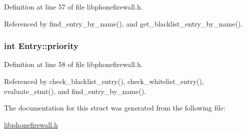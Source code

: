 Definition at line 57 of file libphonefirewall.h.

Referenced by find\_\-entry\_\-by\_\-name(), and get\_\-blacklist\_\-entry\_\-by\_\-name().\hypertarget{structEntry_85af261b3171c257892b54a7200da061}{
\subsubsection{\setlength{\rightskip}{0pt plus 5cm}int {\bf Entry::priority}}}
\label{structEntry_85af261b3171c257892b54a7200da061}




Definition at line 58 of file libphonefirewall.h.

Referenced by check\_\-blacklist\_\-entry(), check\_\-whitelist\_\-entry(), evaluate\_\-stmt(), and find\_\-entry\_\-by\_\-name().

The documentation for this struct was generated from the following file:\begin{CompactItemize}
\item 
\hyperlink{libphonefirewall_8h}{libphonefirewall.h}\end{CompactItemize}
